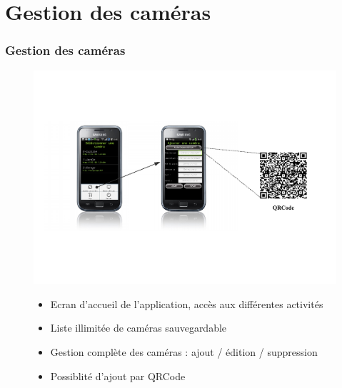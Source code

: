 
\section{Gestion des caméras}
  \begin{frame}
   \frametitle{Gestion des caméras}


\begin{figure}[H]
  \centering
  \includegraphics[scale=0.25]{Images/ImageSlide5.pdf}
     \begin{itemize}
    \item Ecran d'accueil de l'application, accès aux différentes activités
    \item Liste illimitée de caméras sauvegardable
    \item Gestion complète des caméras : ajout / édition / suppression
    \item Possiblité d'ajout par QRCode
   \end{itemize}
  \end{figure}  

  \end{frame}
